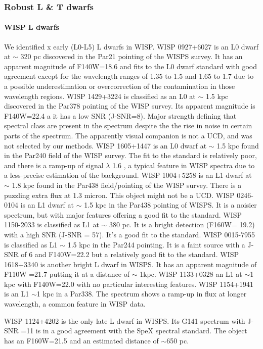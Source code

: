 \documentclass[manuscript]{aastex63}
\begin{document}
\subsubsection{ Robust L \& T dwarfs}
\paragraph{WISP L dwarfs}
We identified x early (L0-L5) L dwarfs in WISP. WISP 0927+6027 is an L0 dwarf at $\sim$ 320 pc discovered in the Par21 pointing of the WISPS survey. It has an apparent magnitude of F140W=18.6 and fits to the L0 dwarf standard with good agreement except for the wavelength ranges of 1.35 to 1.5 \micron and 1.65 to 1.7 \micron due to a possible underestimation or overcorrection of the contamination in those wavelength regions. WISP 1429+3224 is classified as an L0 at $\sim$ 1.5 kpc discovered in the Par378 pointing of the WISP survey. Its apparent magnitude is F140W=22.4 a it has a low SNR (J-SNR=8). Major \wat strength defining that spectral class are present in the spectrum despite the the rise in noise in certain parts of the spectrum. The apparently visual companion is not a UCD, and was not selected by our methods. WISP 1605+1447 is an L0 dwarf at $\sim$ 1.5 kpc found in the Par240 field of the WISP survey. The fit to the standard is relatively poor, and there is a ramp-up of signal $\lambda$ 1.6 \micron, a typical feature in WISP spectra due to a less-precise estimation of the background. WISP 1004+5258 is an L1 dwarf at $\sim$ 1.8 kpc found in the Par438 field/pointing of the WISP survey. There is a puzzling extra flux at 1.3 micron. This object might not be a UCD. WISP 0246-0104 is an L1 dwarf at $\sim$ 1.5 kpc in the Par438 pointing of WISPS. It is a noisier spectrum, but with major features offering a good fit to the standard. WISP 1150-2033 is classified as L1 at $\sim$ 380 pc. It is a bright detection (F160W= 19.2) with a high SNR (J-SNR = 57). It's a good fit to the standard. WISP 0015-7955 is classified as L1 $\sim$ 1.5 kpc in the Par244 pointing. It is a faint source with a J-SNR of 6 and F140W=22.2 but a relatively good fit to the standard. WISP 1618+3340 is another bright L dwarf in WISPS. It has an apparent magnitude of F110W =21.7 putting it at a distance of $\sim$ 1kpc.  WISP 1133+0328 an L1 at $\sim$1 kpc with F140W=22.0  with no particular interesting features. WISP 1154+1941 is an L1 $\sim$1 kpc in a Par338. The spectrum shows a ramp-up in flux at longer wavelength, a common feature in WISP data. 

WISP 1124+4202 is the only late L dwarf in WISPS. Its G141 spectrum with J-SNR =11 is in a good agreement with the SpeX spectral standard. The object has an F160W=21.5 and an estimated distance of $\sim$650 pc.
\end{document}
